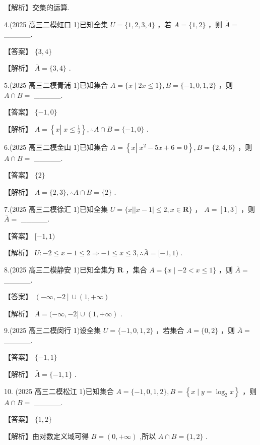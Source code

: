 \documentclass[10pt]{article}
\begin{document}
【解析】交集的运算.

4.(2025 高三二模虹口 1)已知全集 \(U = \{ 1,2,3,4\}\) ，若 \(A = \{ 1,2\}\) ，则 \(\bar{A} =\) \_\_\_\_\_.

【答案】 \(\{ 3,4\}\)

【解析】 \(\bar{A} = \{ 3,4\}\) .

5.(2025 高三二模青浦 1)已知集合 \(A = \{ x \mid  {2x} \leq  1\} ,B = \{  - 1,0,1,2\}\) ，则 \(A \cap  B =\) \_\_\_\_\_.

【答案】 \(\{  - 1,0\}\)

【解析】 \(A = \left\{  {x\left| {\;x \leq  \frac{1}{2}}\right. }\right\}  ,\therefore A \cap  B = \{  - 1,0\}\) .

6.(2025 高三二模金山 1)已知集合 \(A = \left\{  {x\left| {\;{x}^{2} - {5x} + 6 = 0}\right. }\right\}  ,B = \{ 2,4,6\}\) ，则 \(A \cap  B =\) \_\_\_\_\_.

【答案】 \(\{ 2\}\)

【解析】 \(A = \{ 2,3\} ,\therefore A \cap  B = \{ 2\}\) .

7.(2025 高三二模徐汇 1)已知全集 \(U = \{ x\left| \right| x - 1 \mid   \leq  2,x \in  \mathbf{R}\}\) ， \(A = \left\lbrack  {1,3}\right\rbrack\) ，则 \(\bar{A} =\) \_\_\_\_\_.

【答案】 \(\lbrack  - 1,1)\)

【解析】 \(U :  - 2 \leq  x - 1 \leq  2 \Rightarrow   - 1 \leq  x \leq  3,\therefore \bar{A} = \lbrack  - 1,1)\) .

8.(2025 高三二模静安 1)已知全集为 \(\mathbf{R}\) ，集合 \(A = \{ x \mid   - 2 < x \leq  1\}\) ，则 \(\bar{A} =\) \_\_\_\_\_.

【答案】 \(\left( {-\infty , - 2}\right\rbrack   \cup  \left( {1, + \infty }\right)\)

【解析】 \(\bar{A} = ( - \infty , - 2\rbrack  \cup  \left( {1, + \infty }\right)\) .

9.(2025 高三二模闵行 1)设全集 \(U = \{  - 1,0,1,2\}\) ，若集合 \(A = \{ 0,2\}\) ，则 \(\bar{A} =\) \_\_\_\_\_.

【答案】 \(\{  - 1,1\}\)

【解析】 \(\bar{A} = \{  - 1,1\}\) .

10. (2025 高三二模松江 1)已知集合 \(A = \{  - 1,0,1,2\} ,B = \left\{  {x \mid  y = {\log }_{2}x}\right\}\) ，则 \(A \cap  B =\) \_\_\_\_\_.

【答案】 \(\{ 1,2\}\)

【解析】由对数定义域可得 \(B = \left( {0, + \infty }\right)\) ,所以 \(A \cap  B = \{ 1,2\}\) .
\end{document}
